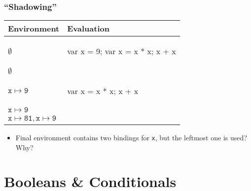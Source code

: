 \documentclass{beamer}
\begin{document}
\begin{frame}[fragile]
\frametitle{``Shadowing''}

\begin{tabular}{ll}
Environment & Evaluation
\\\hline\hline \pause
$\emptyset$
&
\begin{teenycode}
var x = 9; var x = x * x; x + x
\end{teenycode}
\\\hline \pause
$\emptyset$
&
\begin{teenycode}
\end{teenycode}
\\\hline \pause
$\mathtt{x \mapsto 9}$
&
\begin{teenycode}
var x = x * x; x + x
\end{teenycode}
\\\hline \pause
$\mathtt{x \mapsto 9}$
&
\begin{teenycode}
\end{teenycode}
\\\hline \pause
$\mathtt{x \mapsto 81, x \mapsto 9}$
&
\begin{teenycode}
\end{teenycode}
\end{tabular}
\pause
\vfill
\begin{itemize}
\item Final environment contains two bindings for {\tt x}, but the leftmost one is used? Why?
\end{itemize}

\end{frame}

\section{Booleans \& Conditionals}
\end{document}
